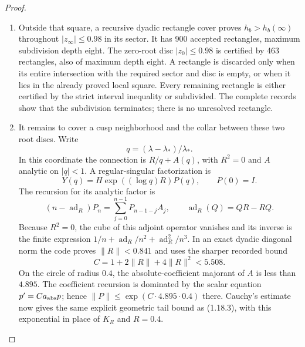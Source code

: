 \documentclass[11pt,a4paper]{article}
\theoremstyle{definition}
\begin{document}
\begin{proof}
\begin{enumerate}[label=\arabic*.]
\item Outside that square, a recursive dyadic rectangle cover proves
$h_b>h_b(\infty)$ throughout $|z_\infty|\leq0.98$ in its sector.
It has 900 accepted rectangles, maximum subdivision depth eight.
The zero-root disc $|z_0|\leq0.98$ is certified by 463 rectangles,
also of maximum depth eight.  A rectangle is discarded only when
its entire intersection with the required sector and disc is empty,
or when it lies in the already proved local square.  Every remaining
rectangle is either certified by the strict interval inequality or
subdivided.  The complete records show that the subdivision terminates;
there is no unresolved rectangle.

\item It remains to cover a cusp neighborhood and the collar between these
two root discs.  Write
\[
 q=(\lambda-\lambda_*)/\lambda_*.
\]
In this coordinate the connection is $R/q+A(q)$, with $R^2=0$
and $A$ analytic on $|q|<1$.  A regular-singular factorization is
\[
 Y(q)=H\exp((\log q)R)P(q),\qquad P(0)=I.
\]
The recursion for its analytic factor is
\[
 (n-\operatorname{ad}_R)P_n
   =\sum_{j=0}^{n-1}P_{n-1-j}A_j,
 \qquad \operatorname{ad}_R(Q)=QR-RQ.
\]
Because $R^2=0$, the cube of this adjoint operator vanishes and its
inverse is the finite expression
$1/n+\operatorname{ad}_R/n^2+\operatorname{ad}_R^2/n^3$.
In an exact dyadic diagonal norm the code proves
$\|R\|<0.841$ and uses the sharper recorded bound
\[
 C=1+2\|R\|+4\|R\|^2<5.508.
\]
On the circle of radius $0.4$, the absolute-coefficient majorant of
$A$ is less than $4.895$.  The coefficient recursion is dominated
by the scalar equation $p'=Ca_{\rm abs}p$; hence
$\|P\|\leq\exp(C\cdot4.895\cdot0.4)$ there.  Cauchy's estimate
now gives the same explicit geometric tail bound as (1.18.3), with
this exponential in place of $K_R$ and $R=0.4$.


\end{enumerate}
\end{proof}
\end{document}

